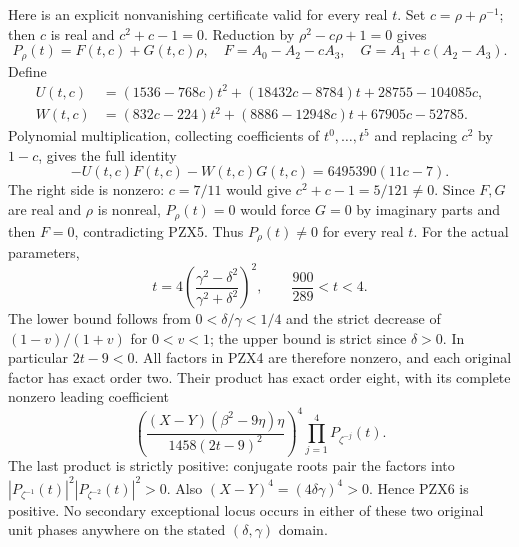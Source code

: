 Here is an explicit nonvanishing certificate valid for every real $t$.
Set $c=\rho+\rho^{-1}$; then $c$ is real and $c^2+c-1=0$.
Reduction by $\rho^2-c\rho+1=0$ gives
\[
 P_\rho(t)=F(t,c)+G(t,c)\rho,
 \quad F=A_0-A_2-cA_3,\quad G=A_1+c(A_2-A_3).
\]
Define
\[
\begin{split}
U(t,c)&=(1536-768c)t^2+(18432c-8784)t+28755-104085c,\\
W(t,c)&=(832c-224)t^2+(8886-12948c)t+67905c-52785.
\end{split}
\]
Polynomial multiplication, collecting coefficients of $t^0,\ldots,t^5$
and replacing $c^2$ by $1-c$, gives the full identity
\[
 -U(t,c)F(t,c)-W(t,c)G(t,c)=6495390(11c-7).            \tag{PZX5}
\]
The right side is nonzero: $c=7/11$ would give
$c^2+c-1=5/121\ne0$.  Since $F,G$ are real and $\rho$ is nonreal,
$P_\rho(t)=0$ would force $G=0$ by imaginary parts and then $F=0$,
contradicting PZX5.  Thus $P_\rho(t)\ne0$ for every real $t$.
For the actual parameters,
\[
 t=4\left(\frac{\gamma^2-\delta^2}{\gamma^2+\delta^2}\right)^2,
 \qquad \frac{900}{289}<t<4.
\]
The lower bound follows from $0<\delta/\gamma<1/4$ and the
strict decrease of $(1-v)/(1+v)$ for $0<v<1$; the upper bound is
strict since $\delta>0$.  In particular $2t-9<0$.
All factors in PZX4 are therefore nonzero, and each original factor
has exact order two.  Their product has exact order eight, with its
complete nonzero leading coefficient
\[
 \left(\frac{(X-Y)(\beta^2-9\eta)\eta}{1458(2t-9)^2}\right)^4
 \prod_{j=1}^4P_{\zeta^{-j}}(t).                     \tag{PZX6}
\]
The last product is strictly positive: conjugate roots pair the
factors into $|P_{\zeta^{-1}}(t)|^2|P_{\zeta^{-2}}(t)|^2>0$.
Also $(X-Y)^4=(4\delta\gamma)^4>0$.  Hence PZX6 is positive.
No secondary exceptional locus occurs in either of these two original
unit phases anywhere on the stated $(\delta,\gamma)$ domain.


